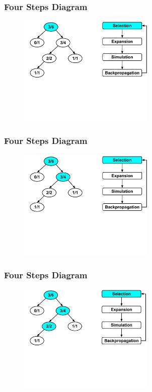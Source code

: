 \documentclass{beamer}
\begin{document}


\begin{frame}[fragile]
\frametitle{Four Steps Diagram}
\begin{figure}[h]
	\includegraphics[width=6.5cm]{Diagrams/MCTSShort/MCTSShortOneOneOne.pdf}
	\centering
\end{figure}
\end{frame}


\begin{frame}[fragile]
\frametitle{Four Steps Diagram}
\begin{figure}[h]
	\includegraphics[width=6.5cm]{Diagrams/MCTSShort/MCTSShortOneOneTwo.pdf}
	\centering
\end{figure}
\end{frame}


\begin{frame}[fragile]
\frametitle{Four Steps Diagram}
\begin{figure}[h]
	\includegraphics[width=6.5cm]{Diagrams/MCTSShort/MCTSShortOneOneThree.pdf}
	\centering
\end{figure}
\end{frame}
\end{document}
